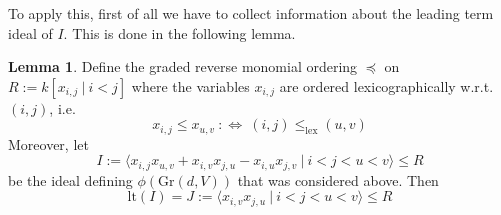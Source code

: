 \documentclass{scrartcl}
\newcommand{\Gr}{\mathrm{Gr}}
\theoremstyle{definition}
\newtheorem{lemma}[subsection]{Lemma}
\begin{document}
To apply this, first of all we have to collect information about the leading term ideal of $I$.
This is done in the following lemma.
\begin{lemma}
    \label{prop:leading_term_ideal_grassmanian}
    Define the graded reverse monomial ordering $\preceq$ on $R := k[x_{i, j} \ | \ i < j]$ where the variables $x_{i, j}$ are ordered lexicographically w.r.t. $(i, j)$, i.e.
    \begin{equation*}
        x_{i, j} \leq x_{u, v} \ :\Leftrightarrow \ (i, j) \leq_{\text{lex}} (u, v)
    \end{equation*}
    Moreover, let
    \begin{equation*}
        I := \langle x_{i, j}x_{u, v} + x_{i, v}x_{j, u} - x_{i, u}x_{j, v} \ | \ i < j < u < v \rangle \leq R
    \end{equation*}
    be the ideal defining $\phi(\Gr(d, V))$ that was considered above. Then
    \begin{equation*}
        \mathrm{lt}(I) = J := \langle x_{i, v} x_{j, u} \ | \ i < j < u < v \rangle \leq R
    \end{equation*}
\end{lemma}
\end{document}

